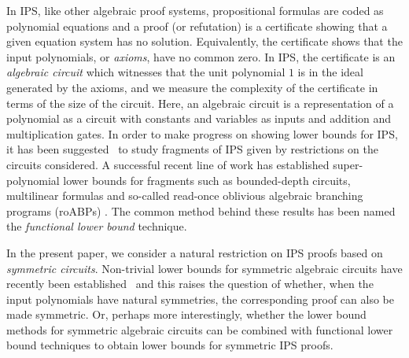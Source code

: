 \documentclass[10pt,a4paper]{article}
\begin{document}
	In IPS, like other algebraic proof systems, propositional formulas are coded as polynomial equations and a proof (or refutation) is a certificate showing that a given equation system has no solution.  Equivalently, the certificate shows that the input polynomials, or \emph{axioms}, have no common zero. In IPS, the certificate is an \emph{algebraic circuit} which witnesses that the unit polynomial $1$ is in the ideal generated by the axioms, and we measure the complexity of the certificate in terms of the size of the circuit.  Here, an algebraic circuit is a representation of a polynomial as a circuit with constants and variables as inputs and addition and multiplication gates. In order to make progress on showing lower bounds for IPS, it has been suggested~\cite{IPS} to study fragments of IPS given by restrictions on the circuits considered.
	A successful recent line of work has established super-polynomial lower bounds for fragments such as bounded-depth circuits, multilinear formulas and so-called read-once oblivious algebraic branching programs (roABPs) \cite{lowerbounds_IPS, limaye2021new, govindasamy2022simple, hakoniemi2024functional}. The common method behind these results has been named the \emph{functional lower bound} technique.
	
	In the present paper, we consider a natural restriction on IPS proofs based on \emph{symmetric circuits}. Non-trivial lower bounds for symmetric algebraic circuits have recently been established~\cite{DawarW20,DawarW22,DawarPS25} and this raises the question of whether, when the input polynomials have natural symmetries, the corresponding proof can also be made symmetric.  Or, perhaps more interestingly, whether the lower bound methods for symmetric algebraic circuits can be combined with functional lower bound techniques to obtain lower bounds for symmetric IPS proofs.
	
\end{document}
